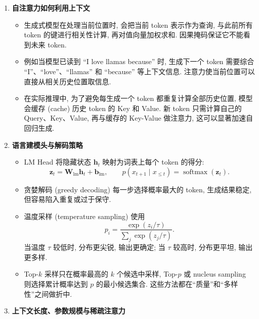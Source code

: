 \documentclass{../nndlcourse}
\begin{document}
\begin{enumerate}
\begin{itemize}
      \item 在许多 Transformer 变体中, FFN 的激活函数会使用 GELU、SwiGLU 等形式. 这些选择与前面学习的激活函数知识相连: 它们既影响表示能力, 也影响优化稳定性.
    \end{itemize}
  \item \textbf{自注意力如何利用上下文}
    \begin{itemize}
      \item 生成式模型在处理当前位置时, 会把当前 token 表示作为查询, 与此前所有 token 的键进行相关性计算, 再对值向量加权求和. 因果掩码保证它不能看到未来 token.
      \item 例如当模型已读到 ``I love llamas because'' 时, 生成下一个 token 需要综合 ``I''、``love''、``llamas'' 和 ``because'' 等上下文信息. 注意力使当前位置可以直接从相关历史位置取信息.
      \item 在实际推理中, 为了避免每生成一个 token 都重复计算全部历史位置, 模型会缓存 (cache) 历史 token 的 Key 和 Value. 新 token 只需计算自己的 Query、Key、Value, 再与缓存的 Key-Value 做注意力, 这可以显著加速自回归生成.
    \end{itemize}
  \item \textbf{语言建模头与解码策略}
    \begin{itemize}
      \item LM Head 将隐藏状态 $\boldsymbol{h}_t$ 映射为词表上每个 token 的得分:
      \begin{equation*}
        \boldsymbol{z}_t = \boldsymbol{W}_{\mathrm{lm}}\boldsymbol{h}_t + \boldsymbol{b}_{\mathrm{lm}},
        \qquad
        p(x_{t+1}\mid x_{\le t}) = \operatorname{softmax}(\boldsymbol{z}_t).
      \end{equation*}
      \item 贪婪解码 (greedy decoding) 每一步选择概率最大的 token, 生成结果稳定, 但容易陷入重复或过于保守.
      \item 温度采样 (temperature sampling) 使用
      \begin{equation*}
        p_i = \frac{\exp(z_i/\tau)}{\sum_j \exp(z_j/\tau)}.
      \end{equation*}
      当温度 $\tau$ 较低时, 分布更尖锐, 输出更确定; 当 $\tau$ 较高时, 分布更平坦, 输出更多样.
      \item Top-$k$ 采样只在概率最高的 $k$ 个候选中采样, Top-$p$ 或 nucleus sampling 则选择累计概率达到 $p$ 的最小候选集合. 这些方法都在“质量”和“多样性”之间做折中.
    \end{itemize}
  \item \textbf{上下文长度、参数规模与稀疏注意力}
    \begin{itemize}

\end{itemize}
\end{enumerate}
\end{document}
